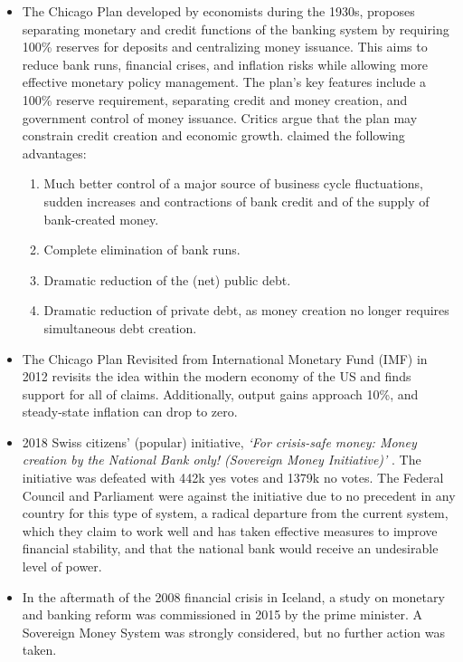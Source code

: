 \begin{itemize}
    \item The Chicago Plan \cite{fisher1936} developed by economists during the 1930s, proposes separating monetary and credit functions of the banking system by requiring 100\% reserves for deposits and centralizing money issuance. This aims to reduce bank runs, financial crises, and inflation risks while allowing more effective monetary policy management. The plan's key features include a 100\% reserve requirement, separating credit and money creation, and government control of money issuance. Critics argue that the plan may constrain credit creation and economic growth. \textcite{fisher1936} claimed the following advantages:
    \begin{enumerate}
        \item Much better control of a major source of business cycle fluctuations, sudden increases and contractions of bank credit and of the supply of bank-created money.
        \item Complete elimination of bank runs.
        \item Dramatic reduction of the (net) public debt.
        \item Dramatic reduction of private debt, as money creation no longer requires simultaneous debt creation.
        \end{enumerate}
        \item The Chicago Plan Revisited \cite{chicagorevisited} from International Monetary Fund (IMF) in 2012 revisits the idea within the modern economy of the US and finds support for all of \textcite{fisher1936} claims. Additionally, output gains approach 10\%, and steady-state inflation can drop to zero.
        \item 2018 Swiss citizens’ (popular) initiative, \textit{‘For crisis-safe money: Money creation by the National Bank only! (Sovereign Money Initiative)’} \cite{SwizzInitiative}. The initiative was defeated with 442k yes votes and 1379k no votes. The Federal Council and Parliament were against the initiative due to no precedent in any country for this type of system, a radical departure from the current system, which they claim to work well and has taken effective measures to improve financial stability, and that the national bank would receive an undesirable level of power.
        \item In the aftermath of the 2008 financial crisis in Iceland, a study on monetary and banking reform \cite{IcelandReport} was commissioned in 2015 by the prime minister. A Sovereign Money System was strongly considered, but no further action was taken.
\end{itemize}

